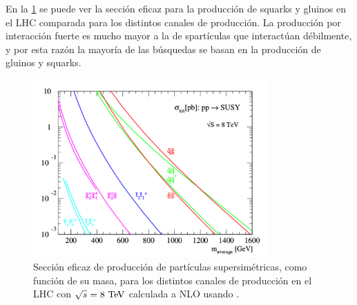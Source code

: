 



En la \cref{fig:xs_lhc_8tev} se puede ver la sección eficaz para la producción
de squarks y gluinos en el LHC comparada para los distintos canales de
producción. La producción por interacción fuerte es mucho mayor a la de
spartículas que interactúan débilmente, y por esta razón la mayoría de las
búsquedas se basan en la producción de gluinos y squarks.

\begin{figure}[!htbp]
  \centering
  \includegraphics[width=0.8\textwidth]{figures/susy_lhc_xs_8tev}
  \caption{Sección eficaz de producción de partículas supersimétricas, como
    función de su masa, para los distintos canales de producción en el LHC con
    $\sqrt{s} = 8 \tev$ calculada a NLO usando {\prospino} \cite{Beenakker:1996ed}.}
  \label{fig:xs_lhc_8tev}
\end{figure}




